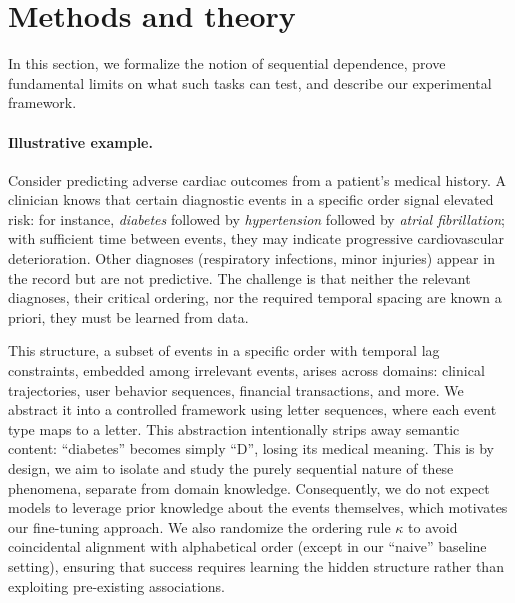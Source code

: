 \documentclass{article}
\theoremstyle{plain}
\theoremstyle{definition}
\theoremstyle{remark}
\begin{document}
\section{Methods and theory}
\label{sec:formulation}

In this section, we formalize the notion of sequential dependence, prove fundamental limits on what such tasks can test, and describe our experimental framework.

\paragraph{Illustrative example.} Consider predicting adverse cardiac outcomes from a patient's medical history. A clinician knows that certain diagnostic events in a specific order signal elevated risk: for instance, \emph{diabetes} followed by \emph{hypertension} followed by \emph{atrial fibrillation}; with sufficient time between events, they may indicate progressive cardiovascular deterioration. Other diagnoses (respiratory infections, minor injuries) appear in the record but are not predictive. The challenge is that neither the relevant diagnoses, their critical ordering, nor the required temporal spacing are known a priori, they must be learned from data.

This structure, a subset of events in a specific order with temporal lag constraints, embedded among irrelevant events, arises across domains: clinical trajectories, user behavior sequences, financial transactions, and more. We abstract it into a controlled framework using letter sequences, where each event type maps to a letter. This abstraction intentionally strips away semantic content: ``diabetes'' becomes simply ``D'', losing its medical meaning. This is by design, we aim to isolate and study the purely sequential nature of these phenomena, separate from domain knowledge. Consequently, we do not expect models to leverage prior knowledge about the events themselves, which motivates our fine-tuning approach. We also randomize the ordering rule $\kappa$ to avoid coincidental alignment with alphabetical order (except in our ``naive'' baseline setting), ensuring that success requires learning the hidden structure rather than exploiting pre-existing associations.
\end{document}
